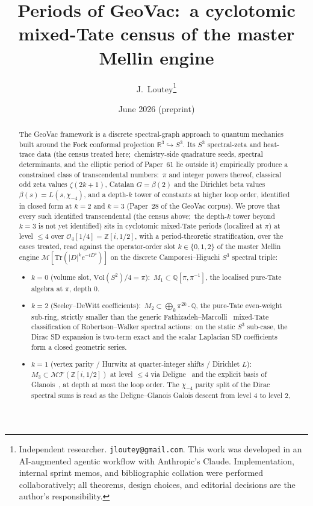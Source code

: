 \documentclass[11pt,a4paper]{article}
\title{Periods of GeoVac:\ a cyclotomic mixed-Tate census of
the master Mellin engine}
\author{J.~Loutey\thanks{Independent researcher.
\texttt{jloutey@gmail.com}.  This work was developed in an
AI-augmented agentic workflow with Anthropic's Claude.
Implementation, internal sprint memos, and bibliographic collation
were performed collaboratively; all theorems, design choices, and
editorial decisions are the author's responsibility.}}
\date{June 2026 (preprint)}
\theoremstyle{plain}
\theoremstyle{definition}
\newcommand{\sthree}{S^{3}}
\newcommand{\R}{\mathbb{R}}
\newcommand{\Z}{\mathbb{Z}}
\newcommand{\Q}{\mathbb{Q}}
\newcommand{\Vol}{\mathrm{Vol}}
\newcommand{\Tr}{\mathrm{Tr}}
\newcommand{\MT}{\mathcal{MT}}
\newcommand{\Mcal}{\mathcal{M}}
\begin{document}
\maketitle

\begin{abstract}
The GeoVac framework is a discrete spectral-graph approach to
quantum mechanics built around the Fock conformal projection
$\R^3 \hookrightarrow \sthree$.  Its $\sthree$ spectral-zeta and
heat-trace data (the census treated here;\ chemistry-side quadrature
seeds, spectral determinants, and the elliptic period of Paper~61 lie
outside it) empirically produce a constrained class of transcendental
numbers:\
$\pi$ and integer powers thereof, classical odd zeta values
$\zeta(2k+1)$, Catalan $G = \beta(2)$ and the Dirichlet beta values
$\beta(s) = L(s, \chi_{-4})$, and a depth-$k$ tower of constants at
higher loop order, identified in closed form at $k = 2$ and $k = 3$
(Paper~28 of the GeoVac corpus).  We
prove that every such identified transcendental (the census above;\ the
depth-$k$ tower beyond $k = 3$ is not yet identified) sits in cyclotomic mixed-Tate
periods (localized at $\pi$) at level $\le 4$ over $\mathcal{O}_4[1/4] = \Z[i, 1/2]$, with
a period-theoretic stratification, over the cases treated, read against the
operator-order slot $k \in \{0, 1, 2\}$ of the master Mellin engine
$\Mcal[\Tr(|D|^k e^{-tD^2})]$ on the discrete Camporesi--Higuchi
$\sthree$ spectral triple:
\begin{itemize}
  \item $k = 0$ (volume slot, $\Vol(S^2)/4 = \pi$):\
    $M_1 \subset \Q[\pi, \pi^{-1}]$, the localised pure-Tate algebra
    at $\pi$, depth $0$.
  \item $k = 2$ (Seeley--DeWitt coefficients):\
    $M_2 \subset \bigoplus_k \pi^{2k}\cdot\Q$, the pure-Tate
    even-weight sub-ring, strictly smaller than the generic
    Fathizadeh--Marcolli~\cite{fathizadeh_marcolli2016} mixed-Tate
    classification of Robertson--Walker spectral actions:\ on the
    static $\sthree$ sub-case, the Dirac SD expansion is two-term
    exact and the scalar Laplacian SD coefficients form a closed
    geometric series.
  \item $k = 1$ (vertex parity / Hurwitz at quarter-integer shifts /
    Dirichlet $L$):\
    $M_3 \subset \MT(\Z[i, 1/2])$ at level $\le 4$ via
    Deligne~\cite{deligne2010} and the explicit basis of
    Glanois~\cite{glanois2015}, at depth at most the loop order.  The
    $\chi_{-4}$ parity split of the Dirac spectral sums is read as the
    Deligne--Glanois Galois descent from level $4$ to level $2$,

\end{itemize}
\end{abstract}
\end{document}
